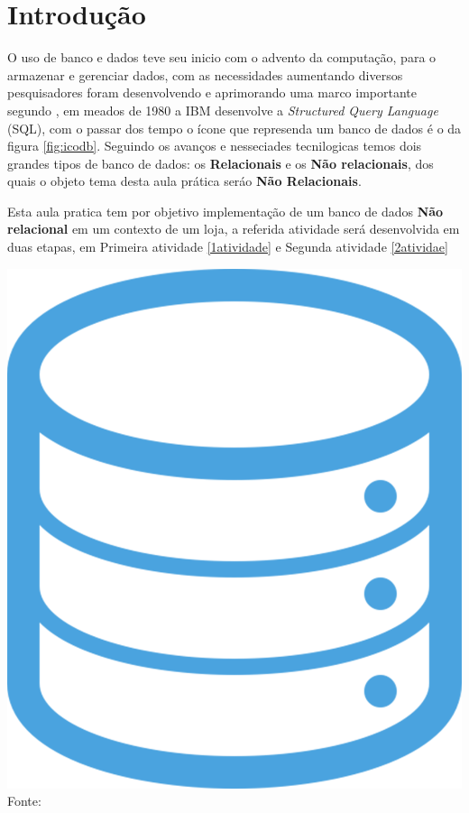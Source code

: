 
\section{Introdução}


\noindent \begin{minipage}[c]{0.6\textwidth}
\par O uso de banco e dados teve seu inicio com o advento da computação, para o armazenar e gerenciar dados, com as necessidades aumentando diversos pesquisadores foram desenvolvendo e aprimorando uma marco importante segundo \cite{histdb:2024}, em meados de 1980 a IBM desenvolve a \textit{Structured Query Language} (SQL), com o passar dos tempo o ícone que represenda um banco de dados é o da figura \ref{fig:icodb}. Seguindo os avanços e nesseciades tecnilogicas temos dois grandes tipos de banco de dados: os \textbf{Relacionais} e os \textbf{Não relacionais}, dos quais o objeto tema desta aula prática seráo \textbf{Não Relacionais}.
\par Esta aula pratica tem por objetivo implementação de um banco de dados \textbf{Não relacional} em um contexto de um loja, a referida atividade será desenvolvida em duas etapas, em Primeira atividade \ref{1atividade} e Segunda atividade \ref{2atividae}


\end{minipage}
\begin{minipage}[c]{0.4\textwidth}
  \includegraphics[width=\textwidth]{figure/pngegg.png}
  \label{fig:icodb}
  {\fontsize{10pt}{\baselineskip}\selectfont
    Fonte: }
\end{minipage}


